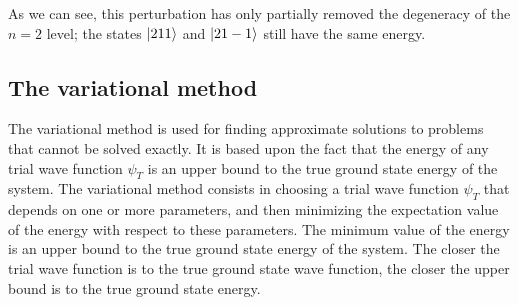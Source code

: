As we can see, this perturbation has only partially removed the degeneracy of the $n= 2$ level; the states $\ket{211}$ and $\ket{21-1}$ still have the same energy.

\subsection{The variational method}

The variational method is used for finding approximate solutions to problems that cannot be solved exactly. It is based upon the fact that the energy of any trial wave function $\psi_T$ is an upper bound to the true ground state energy of the system. The variational method consists in choosing a trial wave function $\psi_T$ that depends on one or more parameters, and then minimizing the expectation value of the energy with respect to these parameters. The minimum value of the energy is an upper bound to the true ground state energy of the system. The closer the trial wave function is to the true ground state wave function, the closer the upper bound is to the true ground state energy.

